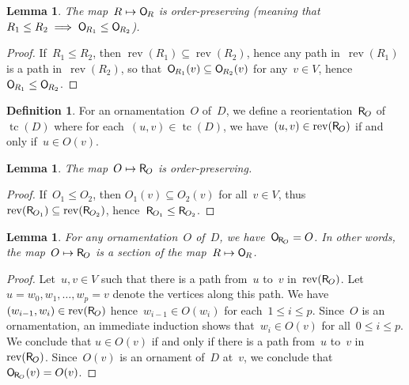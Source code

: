 \documentclass{amsart}
\newtheorem{lemma}[theorem]{Lemma}
\theoremstyle{definition}
\newtheorem{definition}[theorem]{Definition}
\DeclareMathOperator{\tc}{tc} %
\newcommand{\Vincent}[1]{\todo[size=\tiny,color=blue!30]{ #1 \\ \hfill --- V.}\,}
\newcommand{\mymap}[2]{\mathsf{#1}_{\hspace{-.7pt}#2}}
\newcommand{\orn}[1]{\mymap{O}{#1}}  %
\newcommand{\reori}[1]{\mymap{R}{#1}}  %
\DeclareMathOperator{\rev}{rev} %
\begin{document}
\begin{lemma}
\label{lem:Reori2Orn2}
The map~$R \mapsto \orn{R}$ is order-preserving (meaning that~$R_1 \le R_2 \implies \orn{R_1} \le \orn{R_2}$).
\end{lemma}

\begin{proof}
If~$R_1 \le R_2$, then $\rev(R_1) \subseteq \rev(R_2)$, hence any path in~$\rev(R_1)$ is a path in~$\rev(R_2)$, so that~$\orn{R_1}(v) \subseteq \orn{R_2}(v)$ for any~$v \in V$, hence~$\orn{R_1} \le \orn{R_2}$.
\end{proof}

\begin{definition}
\label{def:Orn2Reori}
For an ornamentation~$O$ of~$D$, we define a reorientation~$\reori{O}$ of~$\tc(D)$ where for each~$(u,v) \in \tc(D)$, we have~$(u,v) \in \rev(\reori{O})$ if and only if~$u \in O(v)$.
\end{definition}

\begin{lemma}
\label{lem:Orn2Reori1}
The map~$O \mapsto \reori{O}$ is order-preserving.
\end{lemma}

\begin{proof}
If~$O_1 \le O_2$, then $O_1(v) \subseteq O_2(v)$ for all~$v \in V$, thus~$\rev(\reori{O_1}) \subseteq \rev(\reori{O_2})$, hence~${\reori{O_1} \le \reori{O_2}}$.
\end{proof}

\begin{lemma}
\label{lem:Orn2Reori2}
For any ornamentation~$O$ of~$D$, we have~$\orn{\reori{O}} = O$. In other words, the map~${O \mapsto \reori{O}}$ is a section of the map~$R \mapsto \orn{R}$.
\end{lemma}

\begin{proof}
Let~$u,v \in V$ such that there is a path from~$u$ to~$v$ in~$\rev(\reori{O})$.
Let~$u = w_0, w_1, \dots, w_p = v$ denote the vertices along this path.
We have~$(w_{i-1},w_i) \in \rev(\reori{O})$ hence~$w_{i-1} \in O(w_i)$ for each~$1 \le i \le p$.
Since~$O$ is an ornamentation, an immediate induction shows that~$w_i \in O(v)$ for all~$0 \le i \le p$.
We conclude that $u \in O(v)$ if and only if there is a path from~$u$ to~$v$ in~$\rev(\reori{O})$.
Since~$O(v)$ is an ornament of~$D$ at~$v$, we conclude that~$\orn{\reori{O}}(v) = O(v)$.
\end{proof}
\end{document}

